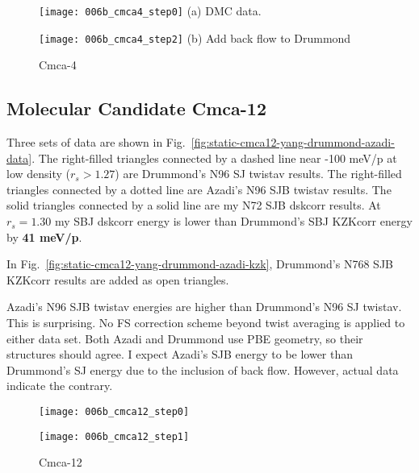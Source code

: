 \begin{figure}[h]
\begin{minipage}{0.48\textwidth}
\texttt{[image: 006b\_cmca4\_step0]}
 (a) DMC data.%
\end{minipage}
\begin{minipage}{0.48\textwidth}
\texttt{[image: 006b\_cmca4\_step2]}
(b) Add back flow to Drummond %
\end{minipage}
\caption{Cmca-4\label{fig:static-cmca4-yang-drummond-azadi}}
\end{figure}

\subsection{Molecular Candidate Cmca-12}

Three sets of data are shown in Fig.~\ref{fig:static-cmca12-yang-drummond-azadi-data}. The right-filled triangles connected by a dashed line near -100 meV/p at low density ($r_s>1.27$) are Drummond's N96 SJ twistav results. The right-filled triangles connected by a dotted line are Azadi's N96 SJB twistav results. The solid triangles connected by a solid line are my N72 SJB dskcorr results. At $r_s=1.30$ my SBJ dskcorr energy is lower than Drummond's SBJ KZKcorr energy by \textbf{41 meV/p}.

In Fig.~\ref{fig:static-cmca12-yang-drummond-azadi-kzk}, Drummond's N768 SJB KZKcorr results are added as open triangles.

Azadi's N96 SJB twistav energies are higher than Drummond's N96 SJ twistav. This is surprising. No FS correction scheme beyond twist averaging is applied to either data set. Both Azadi and Drummond use PBE geometry, so their structures should agree. I expect Azadi's SJB energy to be lower than Drummond's SJ energy due to the inclusion of back flow. However, actual data indicate the contrary.

\begin{figure}[h]
\begin{minipage}{0.48\textwidth}
\texttt{[image: 006b\_cmca12\_step0]}
\end{minipage}
\begin{minipage}{0.48\textwidth}
\texttt{[image: 006b\_cmca12\_step1]}
\end{minipage}
\caption{Cmca-12\label{fig:static-cmca12-yang-drummond-azadi}}
\end{figure}

